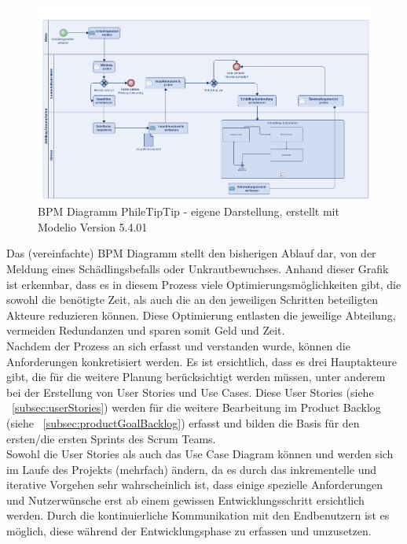 \begin{figure}[!h]
\centering
\includegraphics[width=\textwidth]{BPM}
\caption{BPM Diagramm PhileTipTip - eigene Darstellung, erstellt mit Modelio Version 5.4.01}
\end{figure}

Das (vereinfachte) BPM Diagramm stellt den bisherigen Ablauf dar, von der Meldung eines Schädlingsbefalls oder Unkrautbewuchses. Anhand dieser Grafik ist erkennbar, dass es in diesem Prozess viele Optimierungsmöglichkeiten gibt, die sowohl die benötigte Zeit, als auch die an den jeweiligen Schritten beteiligten Akteure reduzieren können. Diese Optimierung entlasten die jeweilige Abteilung, vermeiden Redundanzen und sparen somit Geld und Zeit.\\

Nachdem der Prozess an sich erfasst und verstanden wurde, können die Anforderungen konkretisiert werden. Es ist ersichtlich, dass es drei Hauptakteure gibt, die für die weitere Planung berücksichtigt werden müssen, unter anderem bei der Erstellung von User Stories und Use Cases. Diese User Stories (siehe ~\ref{subsec:userStories}) werden für die weitere Bearbeitung im Product Backlog (siehe ~\ref{subsec:productGoalBacklog}) erfasst und bilden die Basis für den ersten/die ersten Sprints des Scrum Teams.\\

Sowohl die User Stories als auch das Use Case Diagram können und werden sich im Laufe des Projekts (mehrfach) ändern, da es durch das inkrementelle und iterative Vorgehen sehr wahrscheinlich ist, dass einige spezielle Anforderungen und Nutzerwünsche erst ab einem gewissen Entwicklungsschritt ersichtlich werden. Durch die kontinuierliche Kommunikation mit den Endbenutzern ist es möglich, diese während der Entwicklungsphase zu erfassen und umzusetzen.\\

